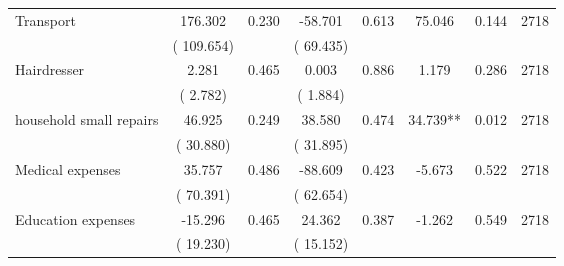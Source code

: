 \begin{tabular}{l*{7}{c}}
 Transport       &            176.302       &        0.230  &            -58.701       &        0.613  &             75.046       &              0.144 &  2718 \\ 
                       &       (     109.654)             &                               &       (      69.435)                     &                               &                                               &                                &                      \\ 

 Hairdresser       &              2.281       &        0.465  &              0.003       &        0.886  &              1.179       &              0.286 &  2718 \\ 
                       &       (       2.782)             &                               &       (       1.884)                     &                               &                                               &                                &                      \\ 

 household small repairs       &             46.925       &        0.249  &             38.580       &        0.474  &             34.739**       &              0.012 &  2718 \\ 
                       &       (      30.880)             &                               &       (      31.895)                     &                               &                                               &                                &                      \\ 

 Medical expenses       &             35.757       &        0.486  &            -88.609       &        0.423  &             -5.673       &              0.522 &  2718 \\ 
                       &       (      70.391)             &                               &       (      62.654)                     &                               &                                               &                                &                      \\ 

 Education expenses       &            -15.296       &        0.465  &             24.362       &        0.387  &             -1.262       &              0.549 &  2718 \\ 
                       &       (      19.230)             &                               &       (      15.152)                     &                               &                                               &                                &                      \\ 


\end{tabular}
